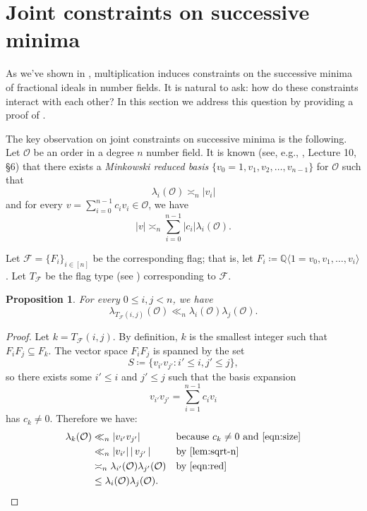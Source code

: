 \documentclass[letterpaper,10pt]{amsart}
\DeclareMathOperator{\lv}{\lvert}
\DeclareMathOperator{\rv}{\rvert}
\newcommand{\QQ}{\mathbb{Q}}      %
\newcommand{\cO}{\mathcal{O}}      %
\newcommand{\cF}{\mathcal{F}}
\newtheorem{proposition}[theorem]{Proposition}
\theoremstyle{definition}
\theoremstyle{remark}
\begin{document}
\section{Joint constraints on successive minima}
\label{sec:joint-constraints}

As we've shown in , multiplication induces constraints on the successive minima of fractional ideals in number fields. It is natural to ask: how do these constraints interact with each other? In this section we address this question by providing a proof of .

The key observation on joint constraints on successive minima is the following. Let $\cO$ be an order in a degree $n$ number field. It is known (see, e.g., \cite{siegel}, Lecture 10, \S 6) that there exists a \emph{Minkowski reduced basis} $\{v_0=1, v_1, v_2,\dots,v_{n-1}\}$ for $\cO$ such that
\begin{equation}
\label{eqn:red}
    \lambda_i(\cO) \asymp_n \lvert v_i \rvert
\end{equation}
and for every $v = \sum_{i = 0}^{n-1}c_i v_i \in \cO$, we have
\begin{equation}
\label{eqn:size}
    \lvert v\rvert \asymp_n \sum_{i = 0}^{n-1}\lvert c_i \rvert \lambda_i(\cO).
\end{equation}

Let $\cF = \{F_i\}_{i \in [n]}$ be the corresponding flag; that is, let $F_i \coloneqq \QQ \langle 1=v_0,v_1,\dots,v_i\rangle$. Let $T_{\cF}$ be the flag type (see ) corresponding to $\cF$.

\begin{proposition}
\label{prop:flag-bound}
For every $0 \leq i,j < n$, we have
\[
    \lambda_{T_{\cF}(i,j)}(\cO) \ll_n \lambda_{i}(\cO)\lambda_j(\cO).
\]
\end{proposition}
\begin{proof}
Let $k = T_{\cF}(i,j)$. By definition, $k$ is the smallest integer such that $F_i F_j \subseteq F_k$. The vector space $F_iF_j$ is spanned by the set
\[
    S \coloneqq \{v_{i'}v_{j'} : i' \leq i, j' \leq j\},
\]
so there exists some $i'\leq i$ and $j' \leq j$ such that the basis expansion
\[
    v_{i'}v_{j'} = \sum_{i = 1}^{n-1}c_i v_i
\]
has $c_k \neq 0$. Therefore we have: 
\begin{align*}
\lambda_k(\cO) &\ll_n \lvert v_{i'}v_{j'} \rvert && \text{because $c_k \neq 0$ and \Cref{eqn:size}} \\
&\ll_n \lvert v_{i'} \rvert \lv v_{j'} \rv && \text{by \Cref{lem:sqrt-n}} \\
&\asymp_n \lambda_{i'}(\cO)\lambda_{j'}(\cO) && \text{by \Cref{eqn:red}} \\
& \leq \lambda_{i}(\cO)\lambda_{j}(\cO).
\end{align*}
\end{proof}
\end{document}
